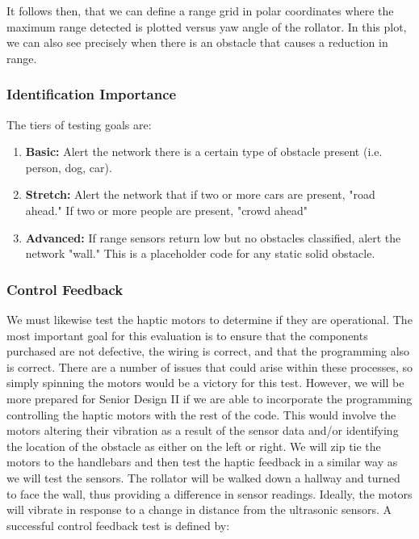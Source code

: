 
\noindent It follows then, that we can define a range grid in polar coordinates where the maximum range detected is plotted versus yaw angle of the rollator. In this plot, we can also see precisely when there is an obstacle that causes a reduction in range.\\

\subsubsection{Identification Importance}
The tiers of testing goals are:
\begin{enumerate}
	\item \textbf{Basic:} Alert the network there is a certain type of obstacle present (i.e. person, dog, car).
	\item \textbf{Stretch:} Alert the network that if two or more cars are present, "road ahead." If two or more people are present, "crowd ahead"
	\item \textbf{Advanced:} If range sensors return low but no obstacles classified, alert the network "wall." This is a placeholder code for any static solid obstacle.
\end{enumerate}

\subsubsection{Control Feedback}
\noindent We must likewise test the haptic motors to determine if they are operational. The most important goal for this evaluation is to ensure that the components purchased are not defective, the wiring is correct, and that the programming also is correct. There are a number of issues that could arise within these processes, so simply spinning the motors would be a victory for this test. However, we will be more prepared for Senior Design II if we are able to incorporate the programming controlling the haptic motors with the rest of the code. This would involve the motors altering their vibration as a result of the sensor data and/or identifying the location of the obstacle as either on the left or right. We will zip tie the motors to the handlebars and then test the haptic feedback in a similar way as we will test the sensors. The rollator will be walked down a hallway and turned to face the wall, thus providing a difference in sensor readings. Ideally, the motors will vibrate in response to a change in distance from the ultrasonic sensors. A successful control feedback test is defined by:

